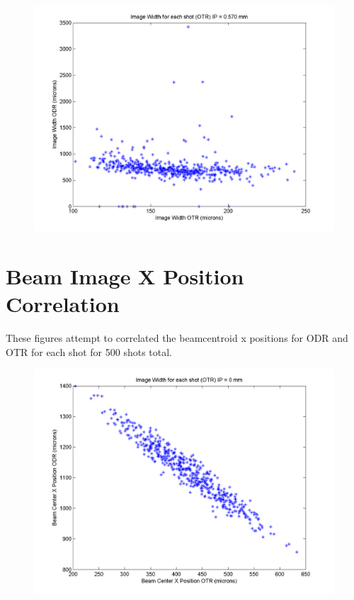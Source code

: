 \documentclass[12pt]{article}
\begin{document}
\begin{figure}
\begin{center}
\includegraphics[scale=0.5]{Figures/ImageWidth_OTRODR_570.PNG}
\caption{}
\end{center}
\end{figure}




\newpage

\section{Beam Image X Position Correlation}

These figures attempt to correlated the beamcentroid x positions for ODR and OTR for each shot for 500 shots total.

\begin{figure}
\begin{center}
\includegraphics[scale=0.5]{Figures/XPosition_OTRODR_0.PNG}
\caption{}
\end{center}
\end{figure}
\end{document}
